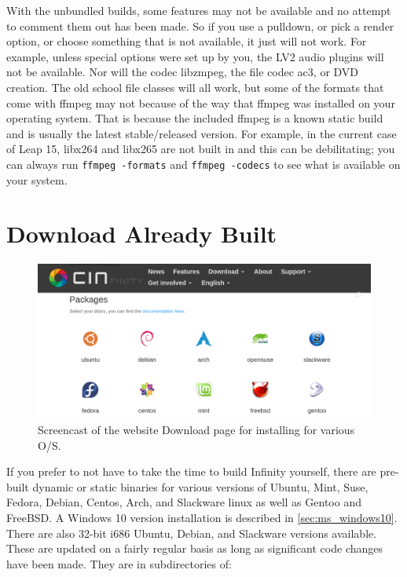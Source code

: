 With the unbundled builds, some features may not be available and no attempt to comment them out has been made.  
So if you use a pulldown, or pick a render option, or choose something that is not available, it just will not work.  
For example, unless special options were set up by you, the LV2 audio plugins will not be available.  
Nor will the codec libzmpeg, the file codec ac3, or DVD creation.  
The old school file classes will all work, but some of the formats that come with ffmpeg may not because of the way that ffmpeg was installed on your operating system.  
That is because the \CGG{} included ffmpeg is a known static build and is usually the latest stable/released version.  
For example, in the current case of Leap 15, libx264 and libx265 are not built in and this can be debilitating; you can always run \texttt{ffmpeg -formats} and \texttt{ffmpeg -codecs} to see what is available on your system.


\section{Download Already Built \CGG{}}%
\label{sec:download_already_built_cinelerra_gg}

\begin{figure}[htpb]
    \centering
    \includegraphics[width=1.0\linewidth]{images/download-distros.png}
    \caption{Screencast of the website Download page for installing \CGG{} for various O/S.}
    \label{fig:download-distros}
\end{figure}

If you prefer to not have to take the time to build \CGG{} Infinity yourself, there are pre-built dynamic or static binaries for various versions of Ubuntu, Mint, Suse, Fedora, Debian, Centos, Arch, and Slackware linux as well as Gentoo and FreeBSD.  
A Windows 10 version installation is described in \ref{sec:ms_windows10}.
There are also 32-bit i686 Ubuntu, Debian, and Slackware versions available.  
These are updated on a fairly regular basis as long as significant code changes have been made.  
They are in subdirectories of:

